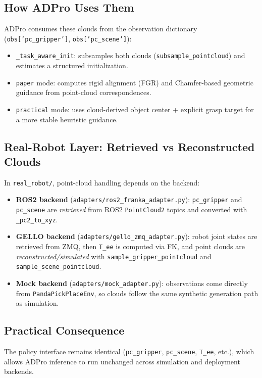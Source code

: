 \documentclass[11pt,a4paper]{article}
\begin{document}
\subsection{How ADPro Uses Them}
ADPro consumes these clouds from the observation dictionary (\texttt{obs['pc\_gripper']}, \texttt{obs['pc\_scene']}):
\begin{itemize}
\item \texttt{\_task\_aware\_init}: subsamples both clouds (\texttt{subsample\_pointcloud}) and estimates a structured initialization.
\item \texttt{paper} mode: computes rigid alignment (FGR) and Chamfer-based geometric guidance from point-cloud correspondences.
\item \texttt{practical} mode: uses cloud-derived object center + explicit grasp target for a more stable heuristic guidance.
\end{itemize}

\subsection{Real-Robot Layer: Retrieved vs Reconstructed Clouds}
In \texttt{real\_robot/}, point-cloud handling depends on the backend:
\begin{itemize}
\item \textbf{ROS2 backend} (\texttt{adapters/ros2\_franka\_adapter.py}): \texttt{pc\_gripper} and \texttt{pc\_scene} are \emph{retrieved} from ROS2 \texttt{PointCloud2} topics and converted with \texttt{\_pc2\_to\_xyz}.
\item \textbf{GELLO backend} (\texttt{adapters/gello\_zmq\_adapter.py}): robot joint states are retrieved from ZMQ, then \texttt{T\_ee} is computed via FK, and point clouds are \emph{reconstructed/simulated} with \texttt{sample\_gripper\_pointcloud} and \texttt{sample\_scene\_pointcloud}.
\item \textbf{Mock backend} (\texttt{adapters/mock\_adapter.py}): observations come directly from \texttt{PandaPickPlaceEnv}, so clouds follow the same synthetic generation path as simulation.
\end{itemize}

\subsection{Practical Consequence}
The policy interface remains identical (\texttt{pc\_gripper}, \texttt{pc\_scene}, \texttt{T\_ee}, etc.), which allows ADPro inference to run unchanged across simulation and deployment backends.
\end{document}
